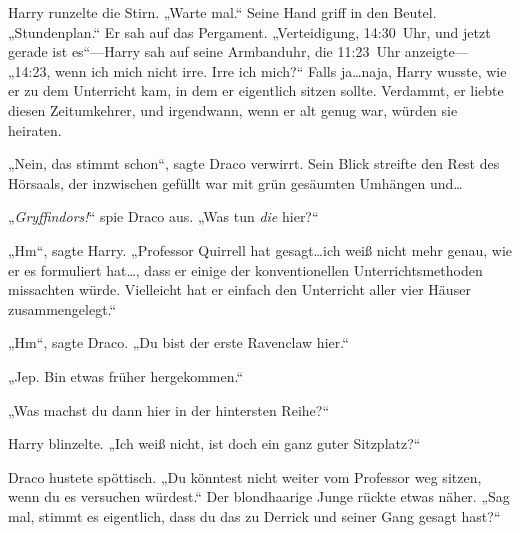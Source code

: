 Harry runzelte die Stirn. „Warte mal.“ Seine Hand griff in den Beutel. „Stundenplan.“ Er sah auf das Pergament. „Verteidigung, 14:30~Uhr, und jetzt gerade ist es“—Harry sah auf seine Armbanduhr, die 11:23~Uhr anzeigte— „14:23, wenn ich mich nicht irre. Irre ich mich?“ Falls ja…naja, Harry wusste, wie er zu dem Unterricht kam, in dem er eigentlich sitzen sollte. Verdammt, er liebte diesen Zeitumkehrer, und irgendwann, wenn er alt genug war, würden sie heiraten.

„Nein, das stimmt schon“, sagte Draco verwirrt. Sein Blick streifte den Rest des Hörsaals, der inzwischen gefüllt war mit grün gesäumten Umhängen und…

„\emph{Gryffindors!}“ spie Draco aus. „Was tun \emph{die} hier?“

„Hm“, sagte Harry. „Professor Quirrell hat gesagt…ich weiß nicht mehr genau, wie er es formuliert hat…, dass er einige der konventionellen Unterrichtsmethoden missachten würde. Vielleicht hat er einfach den Unterricht aller vier Häuser zusammengelegt.“

„Hm“, sagte Draco. „Du bist der erste Ravenclaw hier.“

„Jep. Bin etwas früher hergekommen.“

„Was machst du dann hier in der hintersten Reihe?“

Harry blinzelte. „Ich weiß nicht, ist doch ein ganz guter Sitzplatz?“

Draco hustete spöttisch. „Du könntest nicht weiter vom Professor weg sitzen, wenn du es versuchen würdest.“ Der blondhaarige Junge rückte etwas näher. „Sag mal, stimmt es eigentlich, dass du das zu Derrick und seiner Gang gesagt hast?“

